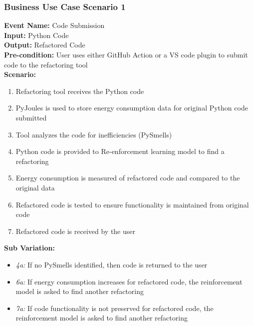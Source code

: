\documentclass[12pt]{article}
\begin{document}
\subsubsection{Business Use Case Scenario 1}
\textbf{Event Name:} Code Submission \\
\textbf{Input:} Python Code \\
\textbf{Output:} Refactored Code \\
\textbf{Pre-condition:} User uses either GitHub Action or a VS code plugin to submit code to the refactoring tool \\  
\textbf{Scenario:}
    \begin{enumerate}
        \item Refactoring tool receives the Python code
        \item PyJoules is used to store energy consumption data for original Python code submitted
        \item Tool analyzes the code for inefficiencies (PySmells)
        \item Python code is provided to Re-enforcement learning model to find a refactoring
        \item Energy consumption is measured of refactored code and compared to the original data
        \item Refactored code is tested to ensure functionality is maintained from original code
        \item Refactored code is received by the user
    \end{enumerate}
\textbf{Sub Variation: }
    \begin{itemize}
        \item \textit{4a:} If no PySmells identified, then code is returned to the user
        \item \textit{6a:} If energy consumption increases for refactored code, the reinforcement model is asked to find another refactoring
        \item \textit{7a:} If code functionality is not preserved for refactored code, the reinforcement model is asked to find another refactoring
    \end{itemize}
\end{document}

